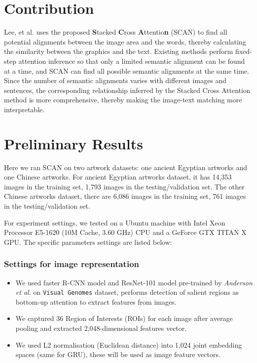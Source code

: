 \section{Contribution}
Lee, et al. \cite{scan} uses the proposed \textbf{S}tacked \textbf{C}ross \textbf{A}ttentio\textbf{n} (SCAN) to find all potential alignments between the image area and the words, thereby calculating the similarity between the graphics and the text. Existing methods perform fixed-step attention inference so that only a limited semantic alignment can be found at a time, and SCAN can find all possible semantic alignments at the same time. Since the number of semantic alignments varies with different images and sentences, the corresponding relationship inferred by the Stacked Cross Attention method is more comprehensive, thereby making the image-text matching more interpretable.


\section{Preliminary Results}
Here we ran SCAN on two artwork datasets: one ancient Egyptian artworks and one Chinese artworks. For ancient Egyptian artworks dataset, it has 14,353 images in the training set, 1,793 images in the testing/validation set. The other Chinese artworks dataset, there are 6,086 images in the training set, 761 images in the testing/validation set.

For experiment settings, we tested on a Ubuntu machine with Intel Xeon Processor E5-1620 (10M Cache, 3.60 GHz) CPU and a GeForce GTX TITAN X GPU. The specific parameters settings are listed below:

\subsubsection{Settings for image representation}

\begin{itemize}
    \item We used faster R-CNN model and ResNet-101 model pre-trained by \textit{Anderson et al.} on \verb|Visual Genomes| dataset, performs detection of salient regions as bottom-up attention to extract features from images. 
    \item We captured 36 Region of Interests (ROIs) for each image after average pooling and extracted 2,048-dimensional features vector.
    \item We used L2 normalisation (Euclidean distance) into 1,024 joint embedding spaces (same for GRU), these will be used as image feature vectors.
\end{itemize}

